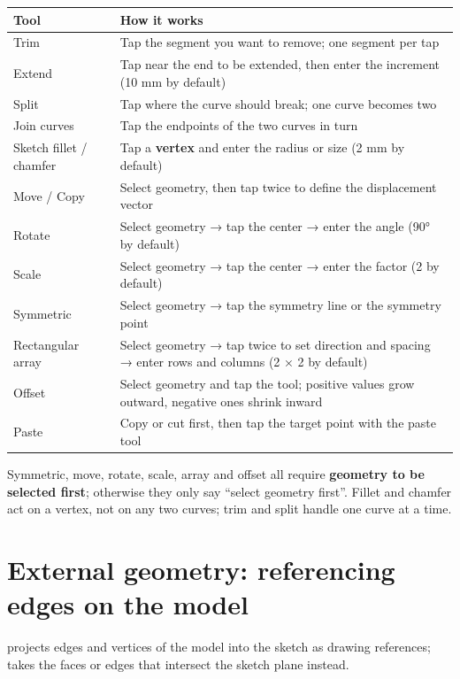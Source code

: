\begin{center}
\small
\begin{tabularx}{\linewidth}{@{}lX@{}}
\toprule
\textbf{Tool} & \textbf{How it works} \\
\midrule
Trim & Tap the segment you want to remove; one segment per tap \\
Extend & Tap near the end to be extended, then enter the increment (10 mm by default)\\
Split & Tap where the curve should break; one curve becomes two \\
Join curves & Tap the endpoints of the two curves in turn \\
Sketch fillet / chamfer & Tap a \textbf{vertex} and enter the radius or size (2 mm by default)\\
Move / Copy & Select geometry, then tap twice to define the displacement vector \\
Rotate & Select geometry → tap the center → enter the angle (90° by default)\\
Scale & Select geometry → tap the center → enter the factor (2 by default)\\
Symmetric & Select geometry → tap the symmetry line or the symmetry point \\
Rectangular array & Select geometry → tap twice to set direction and spacing → enter rows and columns (2 × 2 by default)\\
Offset & Select geometry and tap the tool; positive values grow outward, negative ones shrink inward \\
Paste & Copy or cut first, then tap the target point with the paste tool \\
\bottomrule
\end{tabularx}
\end{center}

\begin{warn}
Symmetric, move, rotate, scale, array and offset all require \textbf{geometry to be selected first}; otherwise they only
say ``select geometry first''. Fillet and chamfer act on a vertex, not on any two curves; trim and split handle one curve
at a time.
\end{warn}

\section{External geometry: referencing edges on the model}

 projects edges and vertices of the model into the sketch as drawing references;
 takes the faces or edges that intersect the sketch plane instead.

